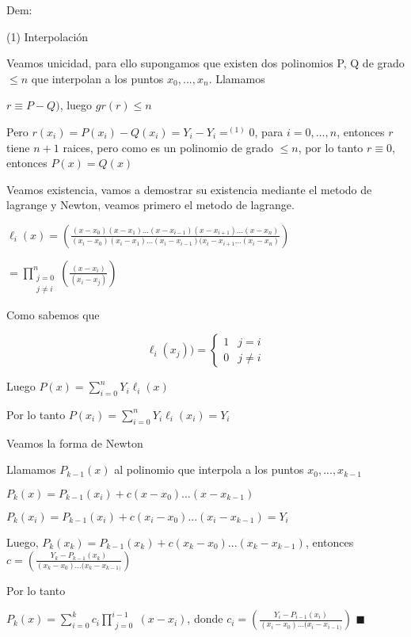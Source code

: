 \documentclass{article}
\begin{document}
Dem:

(1) Interpolación

Veamos unicidad, para ello supongamos que existen dos polinomios P, Q de grado $\leq n$ que interpolan
a los puntos $ x_0,...,x_n $. Llamamos

$r \equiv P-Q) $, luego $gr(r) \leq n$

Pero $r(x_i) = P(x_i)-Q(x_i) = Y_i - Y_i =^{(1)} 0 $, para $i=0,...,n$, entonces $r$ tiene $n+1$ raices, pero como
es un polinomio de grado $\leq n$, por lo tanto $r \equiv 0$, entonces $P(x) = Q(x)$

\vspace{5mm}

Veamos existencia, vamos a demostrar su existencia mediante el metodo de lagrange y Newton, veamos primero el metodo de lagrange.

$\ell_i(x) = \left( \displaystyle\frac{(x-x_0)(x-x_1)...(x-x_{i-1})(x-x_{i+1})...(x-x_n)}{(x_i-x_0)(x_i-x_1)...(x_i-x_{i-1})(x_i-x_{i+1}...(x_i-x_n)} \right)  $

 $ = \prod\limits_{\substack{j=0 \\ j\neq i}}^{n} \left( \displaystyle\frac{(x-x_i)}{(x_i-x_j)} \right) $

 Como sabemos que

 $$
\ell_i(x_j))=
\begin{cases}
1 & j=i\\
0 & j\not=i
\end{cases}
$$

Luego  $P(x) = \sum\limits_{i=0}^n Y_i\ell_i(x)$

Por lo tanto $P(x_i) =\sum\limits_{i=0}^n Y_i\ell_i(x_i) = Y_i $

\vspace{5mm}

Veamos la forma de Newton

Llamamos $P_{k-1}(x)$ al polinomio que interpola a los puntos $x_0,...,x_{k-1}$

$P_k(x)= P_{k-1}(x_i)+c(x-x_0)...(x-x_{k-1}) $

$P_k(x_i)= P_{k-1}(x_i)+c(x_i-x_0)...(x_i-x_{k-1}) = Y_i $

Luego, $P_k(x_k) = P_{k-1}(x_k)+c(x_k-x_0)...(x_k-x_{k-1})$, entonces $c = \left( \displaystyle\frac{Y_k-P_{k-1}(x_k)}{(x_k-x_0)...(x_k-x_{k-1)}} \right)$

Por lo tanto

$P_k(x) = \sum\limits_{i=0}^k c_i\prod\limits_{\substack{j=0}}^{i-1} ( x-x_i) $, donde $c_i = \left( \displaystyle\frac{Y_i-P_{i-1}(x_i)}{(x_i-x_0)...(x_i-x_{i-1)}} \right)$ $\blacksquare$
\end{document}
